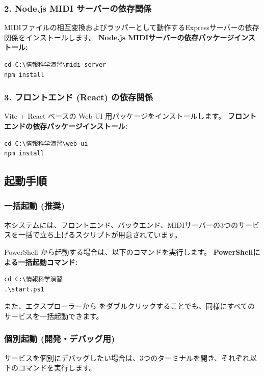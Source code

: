 \subsubsection{2. Node.js MIDI サーバーの依存関係}
MIDIファイルの相互変換およびラッパーとして動作するExpressサーバーの依存関係をインストールします。
\textbf{Node.js MIDIサーバーの依存パッケージインストール:}\\
\begin{lstlisting}[style=powershell]
cd C:\情報科学演習\midi-server
npm install
\end{lstlisting}

\subsubsection{3. フロントエンド (React) の依存関係}
Vite + React ベースの Web UI 用パッケージをインストールします。
\textbf{フロントエンドの依存パッケージインストール:}\\
\begin{lstlisting}[style=powershell]
cd C:\情報科学演習\web-ui
npm install
\end{lstlisting}

\subsection{起動手順}

\subsubsection{一括起動 (推奨)}
本システムには、フロントエンド、バックエンド、MIDIサーバーの3つのサービスを一括で立ち上げるスクリプトが用意されています。

PowerShell から起動する場合は、以下のコマンドを実行します。
\textbf{PowerShellによる一括起動コマンド:}\\
\begin{lstlisting}[style=powershell]
cd C:\情報科学演習
.\start.ps1
\end{lstlisting}

また、エクスプローラーから  をダブルクリックすることでも、同様にすべてのサービスを一括起動できます。

\subsubsection{個別起動 (開発・デバッグ用)}
サービスを個別にデバッグしたい場合は、3つのターミナルを開き、それぞれ以下のコマンドを実行します。

